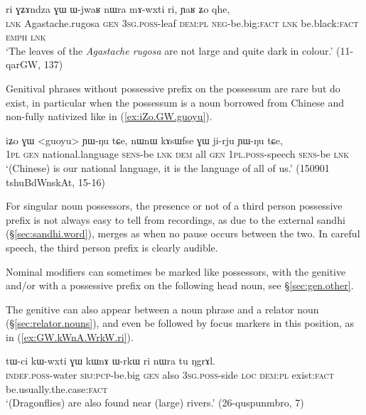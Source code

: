 \begin{exe}
\ex \label{ex:GZAndza.GW.WjwaR}
\gll ri ɣʑɤndza ɣɯ ɯ-jwaʁ nɯra mɤ-wxti ri, ɲaʁ ʑo qhe, \\
\textsc{lnk} Agastache.rugosa \textsc{gen} \textsc{3sg}.\textsc{poss}-leaf \textsc{dem}:\textsc{pl} \textsc{neg}-be.big:\textsc{fact} \textsc{lnk} be.black:\textsc{fact} \textsc{emph} \textsc{lnk} \\
\glt `The leaves of the \textit{Agastache rugosa} are not large and quite dark in colour.' (11-qarGW, 137)
\end{exe}

Genitival phrases without possessive prefix on the possessum are rare but do exist, in particular when the possessum is a noun borrowed from Chinese and non-fully nativized like  in (\ref{ex:iZo.GW.guoyu}).  

\begin{exe}
\ex \label{ex:iZo.GW.guoyu}
\gll iʑo ɣɯ <guoyu> ɲɯ-ŋu tɕe, nɯnɯ kɤsɯfse ɣɯ ji-rju ɲɯ-ŋu tɕe, \\
\textsc{1pl} \textsc{gen} national.language \textsc{sens}-be \textsc{lnk} \textsc{dem} all \textsc{gen} \textsc{1pl}.\textsc{poss}-speech \textsc{sens}-be \textsc{lnk} \\
\glt `(Chinese) is our national language, it is the language of all of us.' (150901 tshuBdWnskAt, 15-16)
\end{exe}

For singular noun possessors, the presence or not of a third person possessive prefix  is not always easy to tell from recordings, as due to the external sandhi (§\ref{sec:sandhi.word}),  merges as  when no pause occurs between the two. In careful speech, the third person prefix is clearly audible.

Nominal modifiers can sometimes be marked like possessors, with the genitive and/or with a possessive prefix on the following head noun, see §\ref{sec:gen.other}. 

The genitive can also appear between a noun phrase and a relator noun (§\ref{sec:relator.nouns}), and even be followed by focus markers in this position, as in (\ref{ex:GW.kWnA.WrkW.ri}).

\begin{exe}
\ex \label{ex:GW.kWnA.WrkW.ri}
\gll   tɯ-ci kɯ-wxti ɣɯ kɯnɤ ɯ-rkɯ ri nɯra tu ŋgrɤl.  \\
\textsc{indef}.\textsc{poss}-water \textsc{sbj}:\textsc{pcp}-be.big \textsc{gen} also \textsc{3sg}.\textsc{poss}-side \textsc{loc} \textsc{dem}:\textsc{pl} exist:\textsc{fact} be.usually.the.case:\textsc{fact} \\
\glt `(Dragonflies) are also found near (large) rivers.' (26-quspunmbro, 7)
\end{exe}

